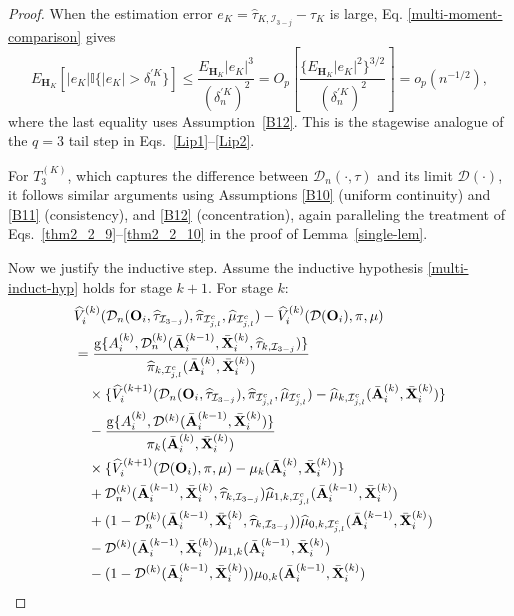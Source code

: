 \documentclass[11pt]{article}
\theoremstyle{referenceplain}
\theoremstyle{referencedefinition}
\theoremstyle{referenceremark}
\begin{document}
\begin{proof}
When the estimation error $e_K=\widehat{\tau}_{K,\mathcal{I}_{3-j}}-\tau_K$ is large, Eq. \eqref{multi-moment-comparison} gives
\[
E_{\mathbf H_K}[|e_K|\mathbb I\{|e_K|>\delta_n^{\prime K}\}]
\le \frac{E_{\mathbf H_K}|e_K|^3}{(\delta_n^{\prime K})^2}
=O_p\left[\frac{\{E_{\mathbf H_K}|e_K|^2\}^{3/2}}{(\delta_n^{\prime K})^2}\right]
=o_p(n^{-1/2}),
\]
where the last equality uses Assumption~\ref{B12}. This is the stagewise analogue of the $q=3$ tail step in Eqs.~\eqref{Lip1}--\eqref{Lip2}.

For $T_3^{(K)}$, which captures the difference between $\mathcal{D}_n(\cdot,\tau)$ and its limit $\mathcal{D}(\cdot)$, it follows similar arguments using Assumptions \ref{B10} (uniform continuity) and \ref{B11} (consistency){, and \ref{B12} (concentration)}, again paralleling the treatment of Eqs.~\eqref{thm2_2_9}--\eqref{thm2_2_10} in the proof of Lemma~\ref{single-lem}.

Now we justify the inductive step. Assume the inductive hypothesis \eqref{multi-induct-hyp} holds for stage $k+1$. For stage $k$:
\begin{align}
    &\widehat{V}_i^{(k)}(\mathcal{D}_n(\mathbf{O}_i,\widehat{\tau}_{\mathcal{I}_{3-j}}),\widehat{\pi}_{\mathcal{I}_{j,l}^c},\widehat{\mu}_{\mathcal{I}_{j,l}^c}) - \widehat{V}_i^{(k)}(\mathcal{D}(\mathbf{O}_i),\pi,\mu)\notag\\
    &= \frac{\mathrm{g}\{A_i^{(k)}, \mathcal{D}_n^{(k)}(\bar{\mathbf{A}}_i^{(k-1)},\bar{\mathbf{X}}_i^{(k)},\widehat{\tau}_{k,\mathcal{I}_{3-j}})\}}{\widehat{\pi}_{k,\mathcal{I}_{j,l}^c}(\bar{\mathbf{A}}_i^{(k)},\bar{\mathbf{X}}_i^{(k)})}\notag\\
    &\quad \times \{\widehat{V}_i^{(k+1)}(\mathcal{D}_n(\mathbf{O}_i,\widehat{\tau}_{\mathcal{I}_{3-j}}),\widehat{\pi}_{\mathcal{I}_{j,l}^c},\widehat{\mu}_{\mathcal{I}_{j,l}^c}) - \widehat{\mu}_{k,\mathcal{I}_{j,l}^c}(\bar{\mathbf{A}}_i^{(k)},\bar{\mathbf{X}}_i^{(k)})\}\notag\\
    &\quad - \frac{\mathrm{g}\{A_i^{(k)}, \mathcal{D}^{(k)}(\bar{\mathbf{A}}_i^{(k-1)},\bar{\mathbf{X}}_i^{(k)})\}}{\pi_k(\bar{\mathbf{A}}_i^{(k)},\bar{\mathbf{X}}_i^{(k)})}\notag\\
    &\quad \times \{\widehat{V}_i^{(k+1)}(\mathcal{D}(\mathbf{O}_i),\pi,\mu) - \mu_k(\bar{\mathbf{A}}_i^{(k)},\bar{\mathbf{X}}_i^{(k)})\}\notag\\
    &\quad + \mathcal{D}_n^{(k)}(\bar{\mathbf{A}}_i^{(k-1)},\bar{\mathbf{X}}_i^{(k)},\widehat{\tau}_{k,\mathcal{I}_{3-j}}) \widehat{\mu}_{1,k,\mathcal{I}_{j,l}^c}(\bar{\mathbf{A}}_i^{(k-1)},\bar{\mathbf{X}}_i^{(k)})\notag\\
&\quad+ (1-\mathcal{D}_n^{(k)}(\bar{\mathbf{A}}_i^{(k-1)},\bar{\mathbf{X}}_i^{(k)},\widehat{\tau}_{k,\mathcal{I}_{3-j}})) \widehat{\mu}_{0,k,\mathcal{I}_{j,l}^c}(\bar{\mathbf{A}}_i^{(k-1)},\bar{\mathbf{X}}_i^{(k)})\notag\\
&\quad- \mathcal{D}^{(k)}(\bar{\mathbf{A}}_i^{(k-1)},\bar{\mathbf{X}}_i^{(k)}) \mu_{1,k}(\bar{\mathbf{A}}_i^{(k-1)},\bar{\mathbf{X}}_i^{(k)})\notag\\
&\quad- (1-\mathcal{D}^{(k)}(\bar{\mathbf{A}}_i^{(k-1)},\bar{\mathbf{X}}_i^{(k)})) \mu_{0,k}(\bar{\mathbf{A}}_i^{(k-1)},\bar{\mathbf{X}}_i^{(k)})
\end{align}


\end{proof}
\end{document}
